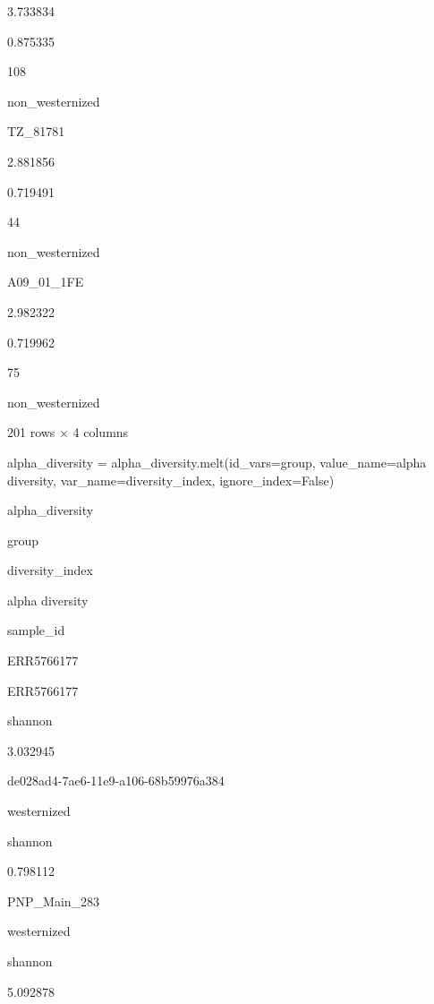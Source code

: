 \documentclass[
  letterpaper,
]{book}
\newenvironment{Shaded}{}{}
\newcommand{\NormalTok}[1]{\textcolor[rgb]{0.14,0.16,0.18}{#1}}
\newcommand{\OperatorTok}[1]{\textcolor[rgb]{0.14,0.16,0.18}{#1}}
\newcommand{\StringTok}[1]{\textcolor[rgb]{0.01,0.18,0.38}{#1}}
\newcommand{\VariableTok}[1]{\textcolor[rgb]{0.89,0.38,0.04}{#1}}
\begin{document}
3.733834

0.875335

108

non\_westernized

TZ\_81781

2.881856

0.719491

44

non\_westernized

A09\_01\_1FE

2.982322

0.719962

75

non\_westernized

201 rows × 4 columns

\begin{Shaded}
\begin{Highlighting}[]
\NormalTok{alpha\_diversity }\OperatorTok{=}\NormalTok{ alpha\_diversity.melt(id\_vars}\OperatorTok{=}\StringTok{\textquotesingle{}group\textquotesingle{}}\NormalTok{, value\_name}\OperatorTok{=}\StringTok{\textquotesingle{}alpha diversity\textquotesingle{}}\NormalTok{, var\_name}\OperatorTok{=}\StringTok{\textquotesingle{}diversity\_index\textquotesingle{}}\NormalTok{, ignore\_index}\OperatorTok{=}\VariableTok{False}\NormalTok{)}
\end{Highlighting}
\end{Shaded}

\begin{Shaded}
\begin{Highlighting}[]
\NormalTok{alpha\_diversity}
\end{Highlighting}
\end{Shaded}

group

diversity\_index

alpha diversity

sample\_id

ERR5766177

ERR5766177

shannon

3.032945

de028ad4-7ae6-11e9-a106-68b59976a384

westernized

shannon

0.798112

PNP\_Main\_283

westernized

shannon

5.092878
\end{document}
